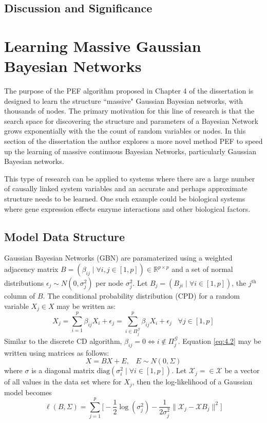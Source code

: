 \documentclass[twoside,11pt]{article}
\newcommand{\reals}{\mathbb{R}}
\let\mc\mathcal
\begin{document}
\subsection{Discussion and Significance}

\section{Learning Massive Gaussian Bayesian Networks}

The purpose of the PEF algorithm proposed in Chapter 4 of the dissertation is designed to learn the structure ``massive" Gaussian Bayesian networks, with thousands of nodes. The primary motivation for this line of research is that the search space for discovering the structure and parameters of a Bayesian Network grows exponentially with the the count of random variables or nodes. In this section of the dissertation the author explores a more novel method PEF to speed up the learning of massive continuous Bayesian Networks, particularly Gaussian Bayesian networks.

This type of research can be applied to systems where there are a large number of causally linked system variables and an accurate and perhaps approximate structure needs to be learned. One such example could be biological systems where gene expression effects enzyme interactions and other biological factors.

\subsection{Model Data Structure}

Gaussian Bayesian Networks (GBN) are paramaterized using a weighted adjacency matrix $B=(\beta_{ij} \mid \forall{i,j}\in[1,p])\in\reals^{p\times p}$ and a set of normal distributions $\epsilon_j \sim N(0,\sigma_j^2)$ per node $\sigma_j^2$. Let $B_j=(B_{ji} \mid \forall i\in[1,p])$, the $j^\text{th}$ column of $B$. The conditional probability distribution (CPD) for a random variable $X_j\in X$ may be written as:
\begin{equation}
    \label{eq:4.2}
    X_j = \sum_{i=1}^p{\beta_{ij}X_i} + \epsilon_j = \sum_{i\in \Pi_j^\mc{G}}^p{\beta_{ij}X_i} + \epsilon_j\;\;\;\forall{j}\in[1,p]
\end{equation}
Similar to the discrete CD algorithm, $\beta_{ij}=0 \iff i \not\in \Pi_j^\mc{G} \label{eq:2.8}$. Equation \eqref{eq:4.2} may be written using matrices as follows:
\begin{equation*}
    X=BX+E,\;\;\;E\sim N(0,\Sigma)
\end{equation*}
where $\sigma$ is a diagonal matrix $\text{diag}(\sigma_i^2 \mid \forall i\in[1,p])$. Let $\mc{X}_j=\in\mc{X}$ be a vector of all values in the data set where for $X_j$, then the log-likelihood of a Gaussian model becomes
\begin{equation}
    \ell(B,\Sigma)=\sum_{j=1}^p\bigg[ -\frac{1}{2}\log(\sigma^2_j)-\frac{1}{2\sigma_j^2}\lVert\mc{X}_j - \mc{X}B_j \rVert^2 \bigg]
\end{equation}
\end{document}
